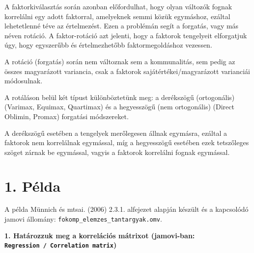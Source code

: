 \documentclass[
  letterpaper,
]{krantz}
\makeatletter
\newenvironment{Shaded}{\begin{snugshade}}{\end{snugshade}}
\newcommand{\AttributeTok}[1]{\textcolor[rgb]{0.40,0.45,0.13}{#1}}
\newcommand{\CommentTok}[1]{\textcolor[rgb]{0.37,0.37,0.37}{#1}}
\newcommand{\FunctionTok}[1]{\textcolor[rgb]{0.28,0.35,0.67}{#1}}
\newcommand{\NormalTok}[1]{\textcolor[rgb]{0.00,0.23,0.31}{#1}}
\newcommand{\OtherTok}[1]{\textcolor[rgb]{0.00,0.23,0.31}{#1}}
\newcommand{\SpecialCharTok}[1]{\textcolor[rgb]{0.37,0.37,0.37}{#1}}
\newcommand{\StringTok}[1]{\textcolor[rgb]{0.13,0.47,0.30}{#1}}
\newenvironment{kframe}{%
\medskip{}
\setlength{\fboxsep}{.8em}
 \def\at@end@of@kframe{}%
 \ifinner\ifhmode%
  \def\at@end@of@kframe{\end{minipage}}%
  \begin{minipage}{\columnwidth}%
 \fi\fi%
 \def\FrameCommand##1{\hskip\@totalleftmargin \hskip-\fboxsep
 \colorbox{shadecolor}{##1}\hskip-\fboxsep
     \hskip-\linewidth \hskip-\@totalleftmargin \hskip\columnwidth}%
 \MakeFramed {\advance\hsize-\width
   \@totalleftmargin\z@ \linewidth\hsize
   \@setminipage}}%
 {\par\unskip\endMakeFramed%
 \at@end@of@kframe}
\renewenvironment{Shaded}{\begin{kframe}}{\end{kframe}}
\makeatother
\begin{document}
A faktorkiválasztás során azonban előfordulhat, hogy olyan változók
fognak korrelálni egy adott faktorral, amelyeknek semmi közük egymáshoz,
ezáltal lehetetlenné téve az értelmezést. Ezen a problémán segít a
forgatás, vagy más néven rotáció. A faktor-rotáció azt jelenti, hogy a
faktorok tengelyeit elforgatjuk úgy, hogy egyszerűbb és értelmezhetőbb
faktormegoldáshoz vezessen.

A rotáció (forgatás) során nem változnak sem a kommunalitás, sem pedig
az összes magyarázott variancia, csak a faktorok
sajátértékei/magyarázott varianciái módosulnak.

A rotáláson belül két típust különböztetünk meg: a derékszögű
(ortogonális) (Varimax, Equimax, Quartimax) és a hegyesszögű (nem
ortogonális) (Direct Oblimin, Promax) forgatási módszereket.

A derékszögű esetében a tengelyek merőlegesen állnak egymásra, ezáltal a
faktorok nem korrelálnak egymással, míg a hegyesszögű esetében ezek
tetszőleges szöget zárnak be egymással, vagyis a faktorok korrelálni
fognak egymással.

\hypertarget{puxe9lda-2}{%
\section{1. Példa}\label{puxe9lda-2}}

A példa Münnich és mtsai. (2006) 2.3.1. alfejezet alapján készült és a
kapcsolódó jamovi állomány: \texttt{fokomp\_elemzes\_tantargyak.omv}.

\textbf{1. Határozzuk meg a korrelációs mátrixot (jamovi-ban:
\texttt{Regression\ /\ Correlation\ matrix})}

\begin{Shaded}
\end{Shaded}
\end{document}
